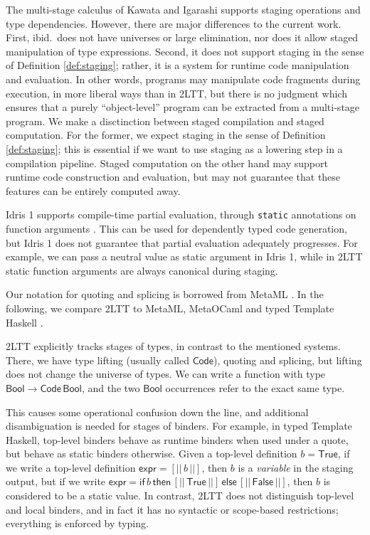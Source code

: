 \documentclass[acmsmall]{acmart}
\newcommand{\msf}[1]{\mathsf{#1}}
\newcommand{\Bool}{\msf{Bool}}
\newcommand{\True}{\msf{True}}
\newcommand{\False}{\msf{False}}
\theoremstyle{remark}
\begin{document}
The multi-stage calculus of Kawata and Igarashi \cite{multi-stage-calculus}
supports staging operations and type dependencies. However, there are major
differences to the current work. First, ibid.\ does not have universes or large
elimination, nor does it allow staged manipulation of type expressions. Second,
it does not support staging in the sense of Definition \ref{def:staging};
rather, it is a system for runtime code manipulation and evaluation. In other
words, programs may manipulate code fragments during execution, in more liberal
ways than in 2LTT, but there is no judgment which ensures that a purely
``object-level'' program can be extracted from a multi-stage program. We make a
disctinction between staged compilation and staged computation. For the former,
we expect staging in the sense of Definition \ref{def:staging}; this is
essential if we want to use staging as a lowering step in a compilation
pipeline. Staged computation on the other hand may support runtime code
construction and evaluation, but may not guarantee that these features can be
entirely computed away.

Idris 1 supports compile-time partial evaluation, through \texttt{static}
annotations on function arguments \cite{scrap-your-inefficient-engine}. This can
be used for dependently typed code generation, but Idris 1 does not guarantee
that partial evaluation adequately progresses. For example, we can pass a neutral
value as static argument in Idris 1, while in 2LTT static function arguments
are always canonical during staging.

Our notation for quoting and splicing is borrowed from MetaML \cite{metaml}.  In
the following, we compare 2LTT to MetaML, MetaOCaml \cite{kiselyov14metaocaml}
and typed Template Haskell \cite{typed-th}.

2LTT explicitly tracks stages of types, in contrast to the mentioned
systems. There, we have type lifting (usually called $\msf{Code}$), quoting and
splicing, but lifting does not change the universe of types. We can write a
function with type $\Bool \to \msf{Code}\,\Bool$, and the two $\Bool$
occurrences refer to the exact same type.

This causes some operational confusion down the line, and additional
disambiguation is needed for stages of binders. For example, in typed Template
Haskell, top-level binders behave as runtime binders when used under a quote,
but behave as static binders otherwise. Given a top-level definition $b =
\True$, if we write a top-level definition $\msf{expr} = [||\,b\,||]$, then $b$
is a \emph{variable} in the staging output, but if we write $\msf{expr} =
\msf{if}\,b\,\msf{then}\,[||\,\True\,||]\,\msf{else}\,[||\,\False\,||]$, then
$b$ is considered to be a static value. In contrast, 2LTT does not distinguish
top-level and local binders, and in fact it has no syntactic or scope-based
restrictions; everything is enforced by typing.
\end{document}
